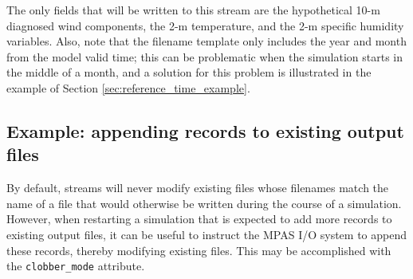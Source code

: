 The only fields that will be written to this stream are the hypothetical 10-m diagnosed wind components, the 2-m temperature, 
and the 2-m specific humidity variables. Also, note that the filename template only includes the year and month from the model 
valid time; this can be problematic when the simulation starts in the middle of a month, and a solution for this problem 
is illustrated in the example of Section \ref{sec:reference_time_example}.

\subsection{Example: appending records to existing output files}
\label{sec:append_example}

By default, streams will never modify existing files whose filenames match the name of a file that would otherwise be written
during the course of a simulation. However, when restarting a simulation that is expected to add more records to existing output 
files, it can be useful to instruct the MPAS I/O system to append these records, thereby modifying existing files. This may be 
accomplished with the {\tt clobber\_mode} attribute.

\vspace{12pt}
 \newline
\hspace*{\mutindent}{\tt type="output"} \newline
\hspace*{\mutindent}{\tt filename\_template="diagnostics.\$Y-\$M.nc"} \newline
\hspace*{\mutindent}{\tt filename\_interval="01-00\_00:00:00"} \newline
\hspace*{\mutindent}{\tt precision="single"} \newline
\hspace*{\mutindent}{\tt clobber\_mode="append"} \newline
\hspace*{\mutindent}{\tt output\_interval="6:00:00" >} \newline
\newline
\hspace*{1cm}{\tt <var name="u10"/>} \newline
\hspace*{1cm}{\tt <var name="v10"/>} \newline
\hspace*{1cm}{\tt <var name="t2"/>} \newline
\hspace*{1cm}{\tt <var name="q2"/>} \newline
\newline
{} \newline
\vspace{12pt}

